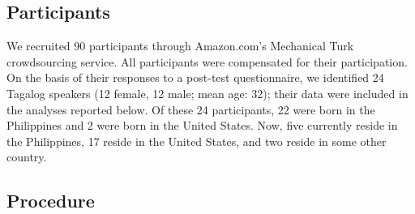 \documentclass[12pt,letterpaper]{article}
\begin{document}
\subsection{Participants} 

We recruited 90 participants through Amazon.com's Mechanical Turk crowdsourcing service. All participants were compensated for their participation. On the basis of their responses to a post-test questionnaire, we identified 24 Tagalog speakers (12 female, 12 male; mean age: 32); their data were included in the analyses reported below. Of these 24 participants, 22 were born in the Philippines and 2 were born in the United States. Now, five currently reside in the Philippines, 17 reside in the United States, and two reside in some other country.

\subsection{Procedure}
\end{document}
